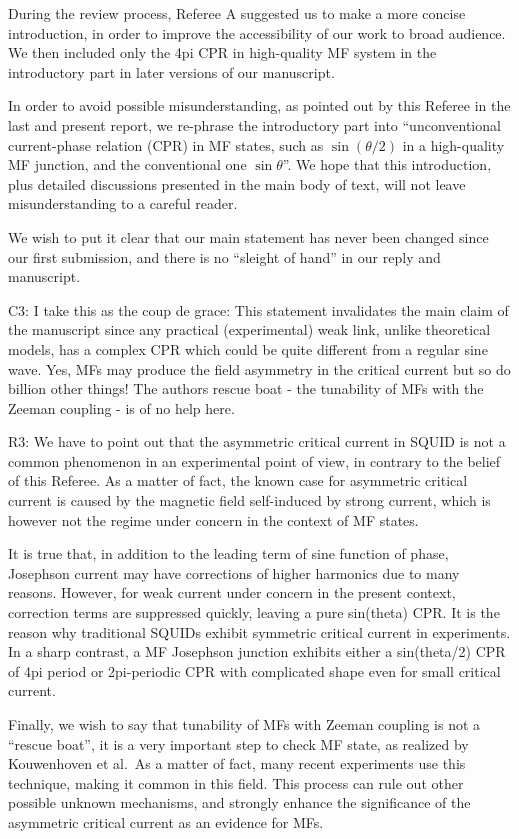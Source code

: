 \documentclass[11pt]{article}
\begin{document}
During the review process, Referee A suggested us to make a more concise
introduction, in order to improve the accessibility of our work to broad
audience. We then included only the 4pi CPR in high-quality MF system in
the introductory part in later versions of our manuscript.

In order to avoid possible misunderstanding, as pointed out by this
Referee in the last and present report, we re-phrase the introductory
part into ``unconventional current-phase relation (CPR) in MF states,
such as \(\sin (\theta/2)\) in a high-quality MF junction, and the
conventional one \(\sin \theta\)''. We hope that this introduction, plus
detailed discussions presented in the main body of text, will not leave
misunderstanding to a careful reader.

We wish to put it clear that our main statement has never been changed
since our first submission, and there is no ``sleight of hand'' in our
reply and manuscript.

C3: I take this as the coup de grace: This statement invalidates the
main claim of the manuscript since any practical (experimental) weak
link, unlike theoretical models, has a complex CPR which could be quite
different from a regular sine wave. Yes, MFs may produce the field
asymmetry in the critical current but so do billion other things! The
authors rescue boat - the tunability of MFs with the Zeeman coupling -
is of no help here.

R3: We have to point out that the asymmetric critical current in SQUID
is not a common phenomenon in an experimental point of view, in contrary
to the belief of this Referee. As a matter of fact, the known case for
asymmetric critical current is caused by the magnetic field self-induced
by strong current, which is however not the regime under concern in the
context of MF states.

It is true that, in addition to the leading term of sine function of
phase, Josephson current may have corrections of higher harmonics due to
many reasons. However, for weak current under concern in the present
context, correction terms are suppressed quickly, leaving a pure
sin(theta) CPR. It is the reason why traditional SQUIDs exhibit
symmetric critical current in experiments. In a sharp contrast, a MF
Josephson junction exhibits either a sin(theta/2) CPR of 4pi period or
2pi-periodic CPR with complicated shape even for small critical current.

Finally, we wish to say that tunability of MFs with Zeeman coupling is
not a ``rescue boat'', it is a very important step to check MF state, as
realized by Kouwenhoven et al.~As a matter of fact, many recent
experiments use this technique, making it common in this field. This
process can rule out other possible unknown mechanisms, and strongly
enhance the significance of the asymmetric critical current as an
evidence for MFs.
\end{document}
